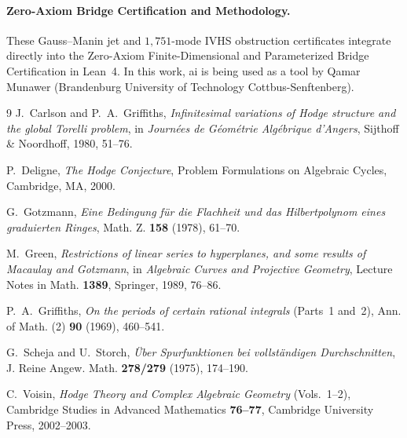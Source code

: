 \documentclass[11pt,a4paper]{article}
\begin{document}
\paragraph*{Zero-Axiom Bridge Certification and Methodology.}
These Gauss--Manin jet and $1{,}751$-mode IVHS obstruction certificates integrate directly into the Zero-Axiom Finite-Dimensional and Parameterized Bridge Certification in Lean~4. In this work, ai is being used as a tool by Qamar Munawer (Brandenburg University of Technology Cottbus-Senftenberg).

\begin{thebibliography}{9}
J.~Carlson and P.~A.~Griffiths, \emph{Infinitesimal variations of Hodge structure and the global Torelli problem}, in \emph{Journ\'ees de G\'eom\'etrie Alg\'ebrique d'Angers}, Sijthoff \& Noordhoff, 1980, 51--76.

P.~Deligne, \emph{The Hodge Conjecture}, Problem Formulations on Algebraic Cycles, Cambridge, MA, 2000.

G.~Gotzmann, \emph{Eine Bedingung f\"ur die Flachheit und das Hilbertpolynom eines graduierten Ringes}, Math. Z. \textbf{158} (1978), 61--70.

M.~Green, \emph{Restrictions of linear series to hyperplanes, and some results of Macaulay and Gotzmann}, in \emph{Algebraic Curves and Projective Geometry}, Lecture Notes in Math. \textbf{1389}, Springer, 1989, 76--86.

P.~A.~Griffiths, \emph{On the periods of certain rational integrals} (Parts~1 and~2), Ann. of Math. (2) \textbf{90} (1969), 460--541.

G.~Scheja and U.~Storch, \emph{\"Uber Spurfunktionen bei vollst\"andigen Durchschnitten}, J. Reine Angew. Math. \textbf{278/279} (1975), 174--190.

C.~Voisin, \emph{Hodge Theory and Complex Algebraic Geometry} (Vols.~1--2), Cambridge Studies in Advanced Mathematics \textbf{76--77}, Cambridge University Press, 2002--2003.
\end{thebibliography}
\end{document}
